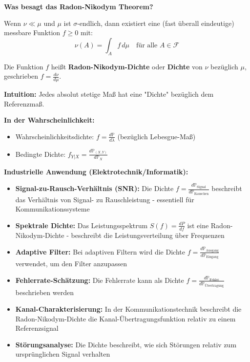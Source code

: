 \begin{denoobification}
\textbf{Was besagt das Radon-Nikodym Theorem?}

Wenn $\nu \ll \mu$ und $\mu$ ist $\sigma$-endlich, dann existiert eine (fast überall eindeutige) messbare Funktion $f \geq 0$ mit:
\[
\nu(A) = \int_A f \, d\mu \quad \text{für alle } A \in \mathcal{F}
\]

Die Funktion $f$ heißt \textbf{Radon-Nikodym-Dichte} oder \textbf{Dichte} von $\nu$ bezüglich $\mu$, geschrieben $f = \frac{d\nu}{d\mu}$.

\textbf{Intuition:} Jedes absolut stetige Maß hat eine "Dichte" bezüglich dem Referenzmaß.

\textbf{In der Wahrscheinlichkeit:}
\begin{itemize}
    \item Wahrscheinlichkeitsdichte: $f = \frac{d\mathbb{P}}{d\lambda}$ (bezüglich Lebesgue-Maß)
    \item Bedingte Dichte: $f_{Y|X} = \frac{d\mathbb{P}_{(X,Y)}}{d\mathbb{P}_X}$
\end{itemize}

\textbf{Industrielle Anwendung (Elektrotechnik/Informatik):}
\begin{itemize}
    \item \textbf{Signal-zu-Rausch-Verhältnis (SNR):} Die Dichte $f = \frac{d\mathbb{P}_{\text{Signal}}}{d\mathbb{P}_{\text{Rauschen}}}$ beschreibt das Verhältnis von Signal- zu Rauschleistung - essentiell für Kommunikationssysteme
    \item \textbf{Spektrale Dichte:} Das Leistungsspektrum $S(f) = \frac{dP}{df}$ ist eine Radon-Nikodym-Dichte - beschreibt die Leistungsverteilung über Frequenzen
    \item \textbf{Adaptive Filter:} Bei adaptiven Filtern wird die Dichte $f = \frac{d\mathbb{P}_{\text{Ausgang}}}{d\mathbb{P}_{\text{Eingang}}}$ verwendet, um den Filter anzupassen
    \item \textbf{Fehlerrate-Schätzung:} Die Fehlerrate kann als Dichte $f = \frac{d\mathbb{P}_{\text{Fehler}}}{d\mathbb{P}_{\text{Übertragung}}}$ beschrieben werden
    \item \textbf{Kanal-Charakterisierung:} In der Kommunikationstechnik beschreibt die Radon-Nikodym-Dichte die Kanal-Übertragungsfunktion relativ zu einem Referenzsignal
    \item \textbf{Störungsanalyse:} Die Dichte beschreibt, wie sich Störungen relativ zum ursprünglichen Signal verhalten
\end{itemize}


\end{denoobification}
